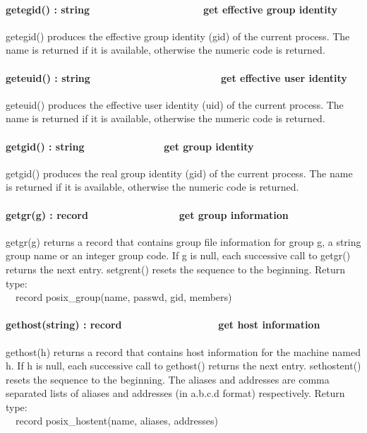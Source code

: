 \paragraph[getegid() : string\ \ \ \ \ \ \ \ \ \ 
\ \ \ \ \ \ \ \ \ \ get effective group identity]{getegid() :
string\ \ \ \ \ \ \ \ \ \  \ \ \ \ \ \ \ \ \ \ get effective group
identity}
getegid() produces the effective group identity (gid) of the current
process. The name is returned if it is available, otherwise the numeric
code is returned.

\paragraph[geteuid() : string\ \ \ \ \ \ \ \ \ \ 
\ \ \ \ \ \ \ \ \ \ \ \ \ get effective user identity]{geteuid() :
string\ \ \ \ \ \ \ \ \ \  \ \ \ \ \ \ \ \ \ \ \ \ \ get effective user
identity}
geteuid() produces the effective user identity (uid) of the current
process. The name is returned if it is available, otherwise the numeric
code is returned.

\paragraph[getgid() : string\ \ \ \ \ \ \ \ \ \ \ \ \ \  get group
identity]{getgid() : string\ \ \ \ \ \ \ \ \ \ \ \ \ \  get group
identity}
getgid() produces the real group identity (gid) of the current process.
The name is returned if it is available, otherwise the numeric code is
returned.

\paragraph[getgr(g) : record\ \ \ \ \ \ \ \ \ \ \ \  \ \ \ \ get group
information]{getgr(g) : record\ \ \ \ \ \ \ \ \ \ \ \  \ \ \ \ get
group information}
getgr(g) returns a record that contains group file information for group
g, a string group name or an integer group code. If g is null, each
successive call to getgr() returns the next entry. setgrent() resets
the sequence to the beginning. Return type:\\
\ \ record posix\_group(name, passwd, gid, members)

\paragraph[gethost(string) : record\ \ \ \ \ \ \ \ \ \ 
\ \ \ \ \ \ \ get host information]{gethost(string) :
record\ \ \ \ \ \ \ \ \ \  \ \ \ \ \ \ \ get host information}
gethost(h) returns a record that contains host information for the
machine named h. If h is null, each successive call to gethost()
returns the next entry. sethostent() resets the sequence to the
beginning. The aliases and addresses are comma separated lists of
aliases and addresses (in a.b.c.d format) respectively. Return
type:\\
\ \ record posix\_hostent(name, aliases, addresses)


